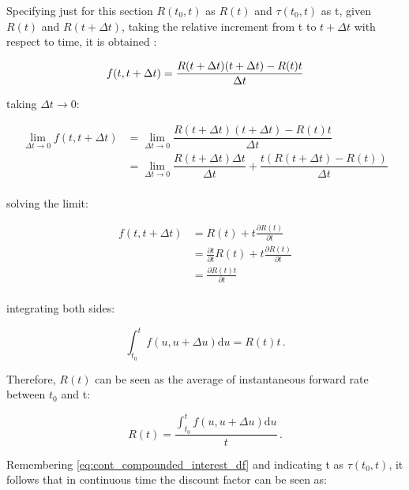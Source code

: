 Specifying just for this section $R(t_{0},t)$ as $R(t)$ and $\tau(t_{0},t)$ as t, given $R(t)$ and $R(t+ \Delta t)$, taking the relative increment from t to $t+ \Delta t$ with respect to time, it is obtained :

\begin{equation*}
f(t,t+ \Delta t) =\dfrac{R(t+ \Delta t)(t+ \Delta t)-R(t)t}{\Delta t}\\
\end{equation*}

taking $\Delta t \to 0$:

\begin{equation*}
\begin{split}
\lim_{\Delta t \to 0}f(t,t+ \Delta t)& =\lim_{\Delta t \to 0}\dfrac{R(t+ \Delta t)(t+ \Delta t)-R(t)t}{\Delta t}\\
& =\lim_{\Delta t \to 0}\dfrac{R(t+ \Delta t)\Delta t}{\Delta t}+\dfrac{t(R(t+ \Delta t)-R(t))}{\Delta t}\\
\end{split}
\end{equation*}

solving the limit:

\begin{equation*}
\begin{split}
f(t,t+ \Delta t)& =R(t)+t\frac{\partial R(t)}{\partial t}\\
&=\frac{\partial t}{\partial t}R(t)+t\frac{\partial R(t)}{\partial t}\\
&=\frac{\partial R(t)t}{\partial t}\\
\end{split}
\end{equation*}

integrating both sides:

\begin{equation*}
\int_{t_{0}}^{t}f(u,u+ \Delta u) \mathrm{d}u=R(t)t\,.
\end{equation*}

Therefore, $R(t)$ can be seen as the average of instantaneous forward rate between $t_{0}$  and t:

\begin{equation}
R(t)=\dfrac{\int_{t_{0}}^{t}f(u,u+ \Delta u)\mathrm{d}u}{t}\,.
\label{eq: spotdate_as_average_ifr}
\end{equation}

Remembering \eqref{eq:cont_compounded_interest_df} and indicating t as $\tau(t_{0},t)$, it follows that in continuous time the discount factor can be seen as:

